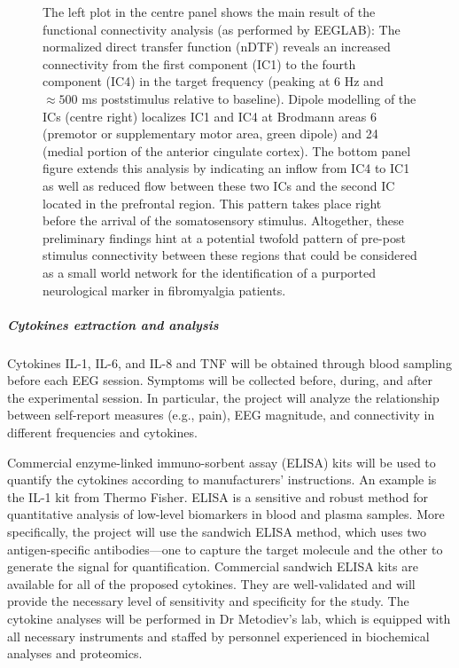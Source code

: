 \documentclass[twocolumn, serif, rga, numeric]{jote-article}
\begin{document}
\renewcommand{\thefigure}{\arabic{figure} (Cont.)}
\addtocounter{figure}{-1}
  \begin{figure}
\caption{
    The left plot in the centre panel shows the main result of the functional connectivity analysis (as performed by EEGLAB): The normalized direct transfer function (nDTF) reveals an increased connectivity from the first component (IC1) to the fourth component (IC4) in the target frequency (peaking at 6 Hz and $\approx500$ ms poststimulus relative to baseline). Dipole modelling of the ICs (centre right) localizes IC1 and IC4 at Brodmann areas 6 (premotor or supplementary motor area, green dipole) and 24 (medial portion of the anterior cingulate cortex). The bottom panel figure extends this analysis by indicating an inflow from IC4 to IC1 as well as reduced flow between these two ICs and the second IC located in the prefrontal region. This pattern takes place right before the arrival of the somatosensory stimulus. Altogether, these preliminary findings hint at a potential twofold pattern of pre-post stimulus connectivity between these regions that could be considered as a small world network for the identification of a purported neurological marker in fibromyalgia patients.
    }
    \end{figure}

\renewcommand{\thefigure}{\arabic{figure}}
\subparagraph{Cytokines extraction and analysis}

Cytokines IL-1, IL-6, and IL-8 and TNF will be obtained through blood
sampling before each EEG session. Symptoms will be collected before,
during, and after the experimental session. In particular, the project
will analyze the relationship between self-report measures (e.g., pain),
EEG magnitude, and connectivity in different frequencies and cytokines.

Commercial enzyme-linked immuno-sorbent assay (ELISA) kits will be used
to quantify the cytokines according to manufacturers' instructions. An
example is the IL-1 kit from Thermo Fisher. ELISA is a sensitive and
robust method for quantitative analysis of low-level biomarkers in blood
and plasma samples. More specifically, the project will use the sandwich
ELISA method, which uses two antigen-specific antibodies—one to
capture the target molecule and the other to generate the signal for
quantification. Commercial sandwich ELISA kits are available for all of
the proposed cytokines. They are well-validated and will provide the
necessary level of sensitivity and specificity for the study. The
cytokine analyses will be performed in Dr Metodiev's lab, which is
equipped with all necessary instruments and staffed by personnel
experienced in biochemical analyses and proteomics.
\end{document}
